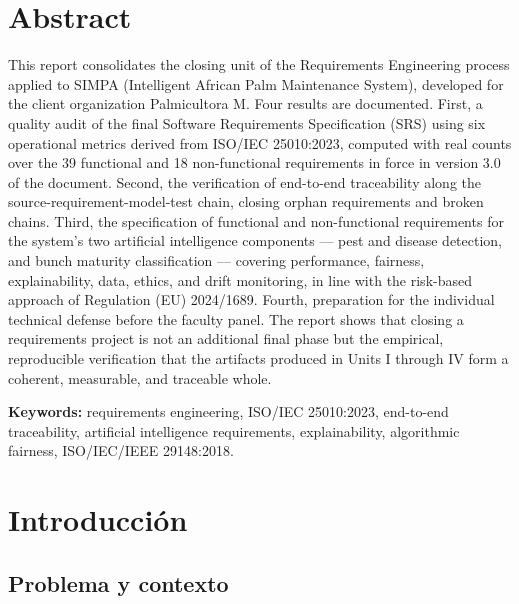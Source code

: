 \documentclass[11pt,a4paper]{article}
\begin{document}
\section*{Abstract}
\noindent
This report consolidates the closing unit of the Requirements Engineering process applied to
SIMPA (Intelligent African Palm Maintenance System), developed for the client organization
Palmicultora M. Four results are documented. First, a quality audit of the final Software
Requirements Specification (SRS) using six operational metrics derived from ISO/IEC 25010:2023,
computed with real counts over the 39 functional and 18 non-functional requirements in force in
version 3.0 of the document. Second, the verification of end-to-end traceability along the
source-requirement-model-test chain, closing orphan requirements and broken chains. Third, the
specification of functional and non-functional requirements for the system's two artificial
intelligence components --- pest and disease detection, and bunch maturity classification ---
covering performance, fairness, explainability, data, ethics, and drift monitoring, in line with
the risk-based approach of Regulation (EU) 2024/1689. Fourth, preparation for the individual
technical defense before the faculty panel. The report shows that closing a requirements project
is not an additional final phase but the empirical, reproducible verification that the artifacts
produced in Units I through IV form a coherent, measurable, and traceable whole.

\vspace{0.3cm}
\noindent\textbf{Keywords:} requirements engineering, ISO/IEC 25010:2023, end-to-end traceability,
artificial intelligence requirements, explainability, algorithmic fairness, ISO/IEC/IEEE
29148:2018.

\newpage
\tableofcontents
\newpage
\listoffigures
\listoftables
\newpage

\section{Introducción}

\subsection{Problema y contexto}
\end{document}

